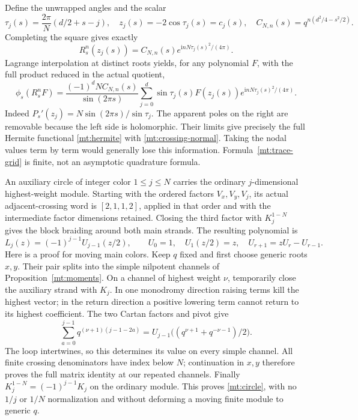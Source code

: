 \documentclass[11pt]{article}
\numberwithin{equation}{section}
\theoremstyle{definition}\newtheorem{definition}[theorem]{Definition}
\theoremstyle{remark}\newtheorem{remark}[theorem]{Remark}
\newcommand{\ii}{\mathrm i}
\begin{document}
Define the unwrapped angles and the scalar
\begin{equation}\label{mt:angles}
 \tau_j(s)=\frac{2\pi}{N}(d/2+s-j),\quad
 z_j(s)=-2\cos\tau_j(s)=c_j(s),\quad
 C_{N,n}(s)=q^{n(d^2/4-s^2/2)}.
\end{equation}
Completing the square gives exactly
\[
 R_s^n(z_j(s))=C_{N,n}(s)e^{\ii nN\tau_j(s)^2/(4\pi)}.
\]
Lagrange interpolation at distinct roots yields, for any polynomial
$F$, with the full product reduced in the actual quotient,
\begin{equation}\label{mt:trace-grid}
 \phi_s(R_s^n F)=\frac{(-1)^dN C_{N,n}(s)}{\sin(2\pi s)}
 \sum_{j=0}^d\sin\tau_j(s)F(z_j(s))
                         e^{\ii nN\tau_j(s)^2/(4\pi)}.
\end{equation}
Indeed $P_s'(z_j)=N\sin(2\pi s)/\sin\tau_j$.
The apparent poles on the right are removable because the left
side is holomorphic. Their limits give precisely the full Hermite
functional \eqref{mt:hermite} with \eqref{mt:crossing-normal}.
Taking the nodal values term by term would generally lose this
information. Formula~\eqref{mt:trace-grid} is finite, not an
asymptotic quadrature formula.

An auxiliary circle of integer color $1\le j\le N$ carries the
ordinary $j$-dimensional highest-weight module. Starting with the
ordered factors $V_x,V_y,V_j$, its actual adjacent-crossing word is
$[2,1,1,2]$, applied in that order and with the intermediate factor
dimensions retained. Closing the third factor with $K_j^{1-N}$
gives the block braiding around both main strands. The resulting polynomial is
\begin{equation}\label{mt:circle}
 L_j(z)=(-1)^{j-1}U_{j-1}(z/2),\qquad
 U_0=1,\quad U_1(z/2)=z,\quad U_{r+1}=zU_r-U_{r-1}.
\end{equation}
Here is a proof for moving main colors. Keep $q$ fixed and first
choose generic roots $x,y$. Their pair splits into the simple
nilpotent channels of Proposition~\ref{mt:moments}. On a channel
of highest weight $\nu$, temporarily close the auxiliary strand
with $K_j$. In one monodromy direction raising terms kill the
highest vector; in the return direction a positive lowering term
cannot return to its highest coefficient. The two Cartan factors
and pivot give
\[
 \sum_{a=0}^{j-1}q^{(\nu+1)(j-1-2a)}
 =U_{j-1}\bigl((q^{\nu+1}+q^{-\nu-1})/2\bigr).
\]
The loop intertwines, so this determines its value on every simple
channel. All finite crossing denominators have index below $N$;
continuation in $x,y$ therefore proves the full matrix identity at
our repeated channels. Finally $K_j^{1-N}=(-1)^{j-1}K_j$ on the
ordinary module. This proves \eqref{mt:circle}, with no $1/j$ or
$1/N$ normalization and without deforming a moving finite module
to generic $q$.
\end{document}
